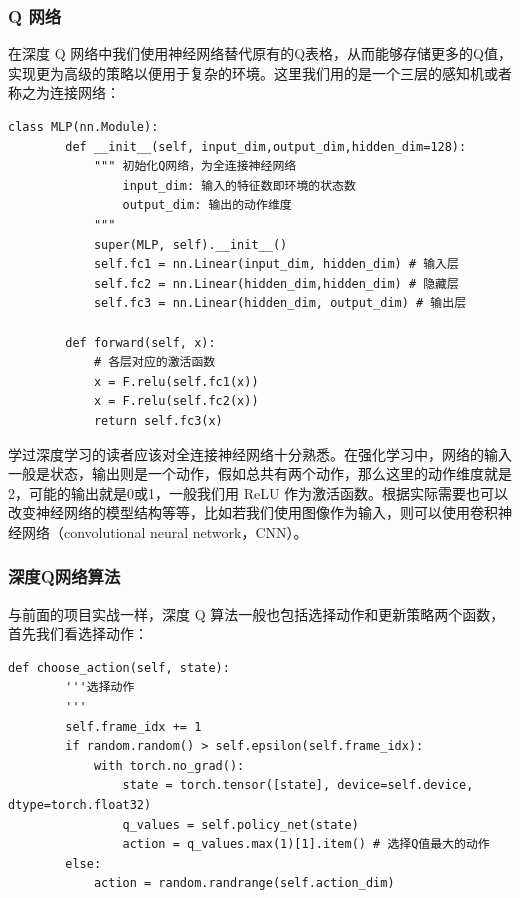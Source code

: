 \subsubsection{ Q 网络} 

在深度 Q 网络中我们使用神经网络替代原有的Q表格，从而能够存储更多的Q值，实现更为高级的策略以便用于复杂的环境。这里我们用的是一个三层的感知机或者称之为连接网络：

\begin{lstlisting}[style=Python]
    class MLP(nn.Module):
        def __init__(self, input_dim,output_dim,hidden_dim=128):
            """ 初始化Q网络，为全连接神经网络
                input_dim: 输入的特征数即环境的状态数
                output_dim: 输出的动作维度
            """
            super(MLP, self).__init__()
            self.fc1 = nn.Linear(input_dim, hidden_dim) # 输入层
            self.fc2 = nn.Linear(hidden_dim,hidden_dim) # 隐藏层
            self.fc3 = nn.Linear(hidden_dim, output_dim) # 输出层
            
        def forward(self, x):
            # 各层对应的激活函数
            x = F.relu(self.fc1(x)) 
            x = F.relu(self.fc2(x))
            return self.fc3(x)
\end{lstlisting}

学过深度学习的读者应该对全连接神经网络十分熟悉。在强化学习中，网络的输入一般是状态，输出则是一个动作，假如总共有两个动作，那么这里的动作维度就是2，可能的输出就是0或1，一般我们用 ReLU 作为激活函数。根据实际需要也可以改变神经网络的模型结构等等，比如若我们使用图像作为输入，则可以使用卷积神经网络（convolutional neural network，CNN）。

\subsubsection{深度Q网络算法}

与前面的项目实战一样，深度 Q 算法一般也包括选择动作和更新策略两个函数，首先我们看选择动作：

\begin{lstlisting}[style=Python]
    def choose_action(self, state):
        '''选择动作
        '''
        self.frame_idx += 1
        if random.random() > self.epsilon(self.frame_idx):
            with torch.no_grad():
                state = torch.tensor([state], device=self.device, dtype=torch.float32)
                q_values = self.policy_net(state)
                action = q_values.max(1)[1].item() # 选择Q值最大的动作
        else:
            action = random.randrange(self.action_dim)
\end{lstlisting}

